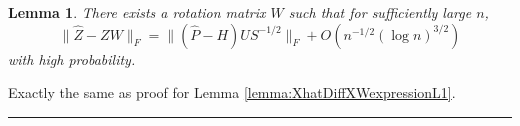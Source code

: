 \documentclass[a4paper]{article}
\newenvironment{proof}{{\bf Proof:  }}{\hfill\rule{2mm}{2mm}}
\newtheorem{lemma}[fact]{Lemma}
\begin{document}
\begin{lemma}
\label{lemma:XhatDiffXWexpression}
There exists a rotation matrix $W$ such that for sufficiently large $n$,
\[
	\|\hat{Z} - Z W\|_F = \| (\hat{P} - H) U S^{-1/2} \|_F + O(n^{-1/2} (\log n)^{3/2})
\]
with high probability.
\end{lemma}
\begin{proof}
Exactly the same as proof for Lemma \ref{lemma:XhatDiffXWexpressionL1}.
\end{proof}
\end{document}

